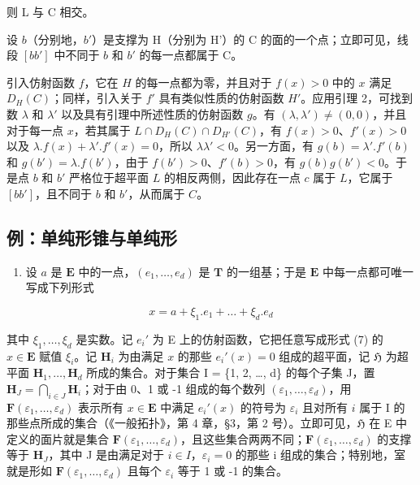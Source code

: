 则 L 与 C 相交。

设 \(b\)（分别地，\(b'\)）是支撑为 H（分别为 H'）的 C 的面的一个点；立即可见，线段 \([bb']\) 中不同于 \(b\) 和 \(b'\) 的每一点都属于 C。

引入仿射函数 \(f\)，它在 \(H\) 的每一点都为零，并且对于 \(f(x) > 0\) 中的 \(x\) 满足 \(D_H(C)\)；同样，引入关于 \(f'\) 具有类似性质的仿射函数 \(H'\)。应用引理 2，可找到数 \(\lambda\) 和 \(\lambda'\) 以及具有引理中所述性质的仿射函数 \(g\)。有 \((\lambda, \lambda') \neq (0, 0)\)，并且对于每一点 \(x\)，若其属于 \(L \cap D_H(C) \cap D_{H'}(C)\)，有 \(f(x) > 0\)、\(f'(x) > 0\) 以及 \(\lambda.f(x) + \lambda'.f'(x) = 0\)，所以 \(\lambda\lambda' < 0\)。另一方面，有 \(g(b) = \lambda'.f'(b)\) 和 \(g(b') = \lambda.f(b')\)，由于 \(f(b') > 0\)、\(f'(b) > 0\)，有 \(g(b)g(b') < 0\)。于是点 \(b\) 和 \(b'\) 严格位于超平面 \(L\) 的相反两侧，因此存在一点 \(c\) 属于 \(L\)，它属于 \([bb']\)，且不同于 \(b\) 和 \(b'\)，从而属于 \(C\)。

\subsection{例：单纯形锥与单纯形}

\begin{enumerate}
\def\labelenumi{\alph{enumi})}
\tightlist
\item
  设 \(a\) 是 \(\mathbf{E}\) 中的一点，\((e_1, \ldots, e_d)\) 是 \(\mathbf{T}\) 的一组基；于是 \(\mathbf{E}\) 中每一点都可唯一写成下列形式
\end{enumerate}

\[
x = a + \xi_ {1}. e _ {1} + \dots + \xi_ {d}. e _ {d}\tag{7}
\]

其中 \(\xi_1, \ldots, \xi_d\) 是实数。记 \(e_i'\) 为 E 上的仿射函数，它把任意写成形式 (7) 的 \(x \in \mathbf{E}\) 赋值 \(\xi_i\)。记 \(\mathbf{H}_i\) 为由满足 \(x\) 的那些 \(e_i'(x) = 0\) 组成的超平面，记 \(\mathfrak{H}\) 为超平面 \(\mathbf{H}_1, \ldots, \mathbf{H}_d\) 所成的集合。对于集合 I = \{1, 2, \ldots, d\} 的每个子集 J，置 \(\mathbf{H}_J = \bigcap_{i \in J} \mathbf{H}_i\)；对于由 0、1 或 -1 组成的每个数列 \((\varepsilon_1, \ldots, \varepsilon_d)\)，用 \(\mathbf{F}(\varepsilon_1, \ldots, \varepsilon_d)\) 表示所有 \(x \in \mathbf{E}\) 中满足 \(e_i'(x)\) 的符号为 \(\varepsilon_i\) 且对所有 \(i\) 属于 I 的那些点所成的集合（《一般拓扑》，第 4 章，§3，第 2 号）。立即可见，\(\mathfrak{H}\) 在 E 中定义的面片就是集合 \(\mathbf{F}(\varepsilon_1, \ldots, \varepsilon_d)\)，且这些集合两两不同；\(\mathbf{F}(\varepsilon_1, \ldots, \varepsilon_d)\) 的支撑等于 \(\mathbf{H}_J\)，其中 J 是由满足对于 \(i \in I\)，\(\varepsilon_i = 0\) 的那些 i 组成的集合；特别地，室就是形如 \(\mathbf{F}(\varepsilon_1, \ldots, \varepsilon_d)\) 且每个 \(\varepsilon_i\) 等于 1 或 -1 的集合。

